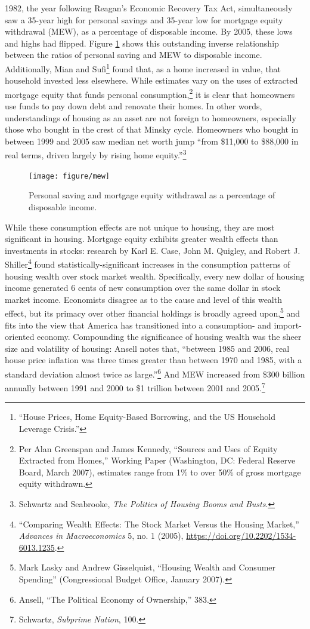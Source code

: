 \documentclass[12pt,oneside]{psthesis}
\begin{document}
1982, the year following Reagan's Economic Recovery Tax Act, simultaneously saw a 35-year high for personal savings and 35-year low for mortgage equity withdrawal (MEW), as a percentage of disposable income.
By 2005, these lows and highs had flipped.
Figure \ref{fig:mew} shows this outstanding inverse relationship between the ratios of personal saving and MEW to disposable income.
Additionally, Mian and Sufi\footnote{``House Prices, Home Equity-Based Borrowing, and the US Household Leverage Crisis.''} found that, as a home increased in value, that household invested less elsewhere.
While estimates vary on the uses of extracted mortgage equity that funds personal consumption,\footnote{Per Alan Greenspan and James Kennedy, ``Sources and Uses of Equity Extracted from Homes,'' Working Paper (Washington, DC: Federal Reserve Board, March 2007), estimates range from 1\% to over 50\% of gross mortgage equity withdrawn.} it is clear that homeowners use funds to pay down debt and renovate their homes.
In other words, understandings of housing as an asset are not foreign to homeowners, especially those who bought in the crest of that Minsky cycle.
Homeowners who bought in between 1999 and 2005 saw median net worth jump ``from \$11,000 to \$88,000 in real terms, driven largely by rising home equity.''\footnote{Schwartz and Seabrooke, \emph{The Politics of Housing Booms and Busts}.}
\begin{figure}

{\centering \texttt{[image: figure/mew]} 

}

\caption{Personal saving and mortgage equity withdrawal as a percentage of disposable income.}\label{fig:mew}
\end{figure}
While these consumption effects are not unique to housing, they are most significant in housing.
Mortgage equity exhibits greater wealth effects than investments in stocks: research by Karl E. Case, John M. Quigley, and Robert J. Shiller\footnote{``Comparing Wealth Effects: The Stock Market Versus the Housing Market,'' \emph{Advances in Macroeconomics} 5, no. 1 (2005), \url{https://doi.org/10.2202/1534-6013.1235}.} found statistically-significant increases in the consumption patterns of housing wealth over stock market wealth.
Specifically, every new dollar of housing income generated 6 cents of new consumption over the same dollar in stock market income.
Economists disagree as to the cause and level of this wealth effect, but its primacy over other financial holdings is broadly agreed upon,\footnote{Mark Lasky and Andrew Gisselquist, ``Housing Wealth and Consumer Spending'' (Congressional Budget Office, January 2007).} and fits into the view that America has transitioned into a consumption- and import-oriented economy.
Compounding the significance of housing wealth was the sheer size and volatility of housing: Ansell notes that, ``between 1985 and 2006, real house price inflation was three times greater than between 1970 and 1985, with a standard deviation almost twice as large.''\footnote{Ansell, ``The Political Economy of Ownership,'' 383.}
And MEW increased from \$300 billion annually between 1991 and 2000 to \$1 trillion between 2001 and 2005.\footnote{Schwartz, \emph{Subprime Nation}, 100.}
\end{document}
